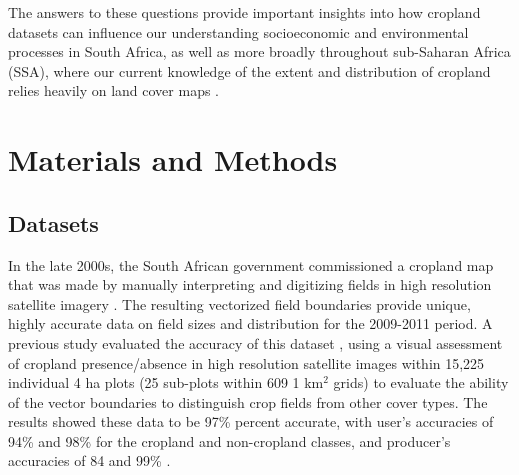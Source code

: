 \documentclass[a4paper]{article}
\begin{document}
The answers to these questions provide important insights into how cropland datasets can influence our understanding socioeconomic and environmental processes in South Africa, as well as more broadly throughout sub-Saharan Africa (SSA), where our current knowledge of the extent and distribution of cropland relies heavily on land cover maps \citep[][]{fritz_comparison_2010, see_improved_2015}. 

\vspace{-0.5 cm}
\section*{Materials and Methods}
\vspace{-0.3 cm}
\subsection*{Datasets}
\vspace{-0.2 cm}
In the late 2000s, the South African government commissioned a cropland map that was made by manually interpreting and digitizing fields in high resolution satellite imagery \citep{fourie_better_2009}. The resulting vectorized field boundaries provide unique, highly accurate data on field sizes and distribution for the 2009-2011 period. A previous study evaluated the accuracy of this dataset \citep{estes_platform_2016}, using a visual assessment of cropland presence/absence in high resolution satellite images within 15,225 individual 4 ha plots (25 sub-plots within 609 1 km$^2$ grids) to evaluate the ability of the vector boundaries to distinguish crop fields from other cover types. The results showed these data to be 97\% percent accurate, with user's accuracies of 94\% and 98\% for the cropland and non-cropland classes, and producer's accuracies of 84 and 99\% \citep[see SI for more description, and][]{estes_platform_2016}. 
\end{document}
